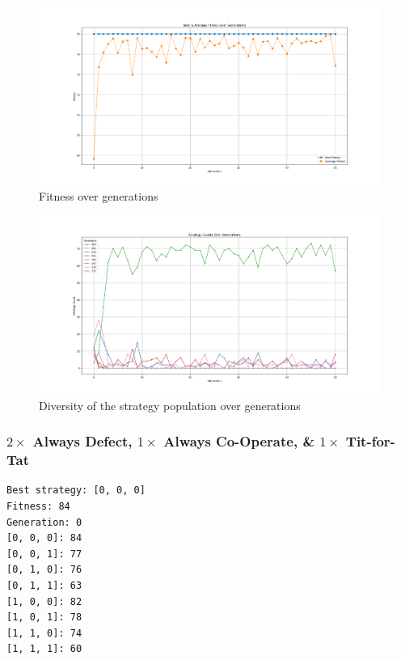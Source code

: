 \documentclass[a4paper]{article}
\newenvironment{code}{\captionsetup{type=listing}}{}
\begin{document}
\begin{figure}[H]
    \centering
    \includegraphics[width=\textwidth]{./images/onefitness.png}
    \caption{ Fitness over generations}
\end{figure}

\begin{figure}[H]
    \centering
    \includegraphics[width=\textwidth]{./images/1strats.png}
    \caption{Diversity of the strategy population over generations}
\end{figure}

\subsubsection{$2 \times $ Always Defect, $1 \times$ Always Co-Operate, \& $1 \times$ Tit-for-Tat}
\begin{code}
\begin{verbatim}
Best strategy: [0, 0, 0]
Fitness: 84
Generation: 0
[0, 0, 0]: 84
[0, 0, 1]: 77
[0, 1, 0]: 76
[0, 1, 1]: 63
[1, 0, 0]: 82
[1, 0, 1]: 78
[1, 1, 0]: 74
[1, 1, 1]: 60
\end{verbatim}
\caption{Output of $2 \times $ always defect, $1 \times$ always co-operate, \& $1 \times$ tit-for-tat}
\end{code}
\end{document}
